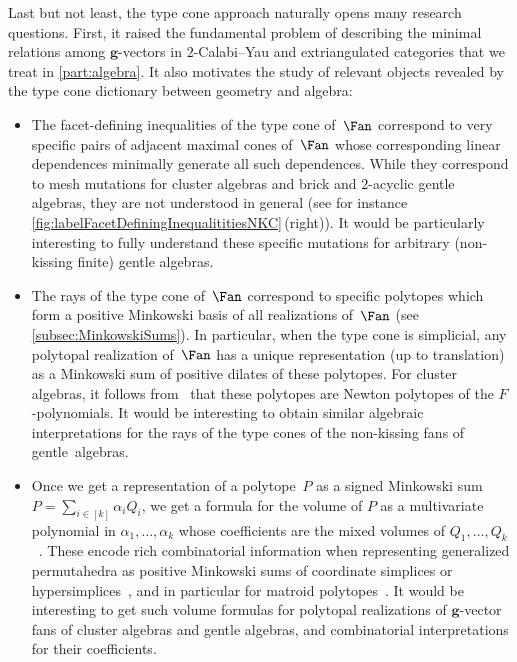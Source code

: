 \documentclass{amsart}
\theoremstyle{definition}
\renewcommand{\b}[1]{{\boldsymbol{#1}}} %
\begin{document}
\medskip
Last but not least, the type cone approach naturally opens many research questions.
First, it raised the fundamental problem of describing the minimal relations among $\b{g}$-vectors in $2$-Calabi--Yau and extriangulated categories that we treat in \cref{part:algebra}.
It also motivates the study of relevant objects revealed by the type cone dictionary between geometry and algebra:

\smallskip
\begin{itemize}
\item The facet-defining inequalities of the type cone of~$\Fan$ correspond to very specific pairs of adjacent maximal cones of~$\Fan$ whose corresponding linear dependences minimally generate all such dependences. While they correspond to mesh mutations for cluster algebras and brick and $2$-acyclic gentle algebras, they are not understood in general (see for instance \cref{fig:labelFacetDefiningInequalititiesNKC}\,(right)). It would be particularly interesting to fully understand these specific mutations for arbitrary (non-kissing finite) gentle algebras.

\smallskip
\item The rays of the type cone of~$\Fan$ correspond to specific polytopes which form a positive Minkowski basis of all realizations of~$\Fan$ (see \cref{subsec:MinkowskiSums}). In particular, when the type cone is simplicial, any polytopal realization of~$\Fan$ has a unique representation (up to translation) as a Minkowski sum of positive dilates of these polytopes. For cluster algebras, it follows from~\cite[Sect.~6]{BazierMatteChapelierLaguetDouvilleMousavandThomasYildirim} that these polytopes are Newton polytopes of the $F$-polynomials. It would be interesting to obtain similar algebraic interpretations for the rays of the type cones of the non-kissing fans of gentle~algebras.

\smallskip
\item Once we get a representation of a polytope~$P$ as a signed Minkowski sum~$P = \sum_{i \in [k]} \alpha_i Q_i$, we get a formula for the volume of $P$ as a multivariate polynomial in $\alpha_1, \dots, \alpha_k$ whose coefficients are the mixed volumes of $Q_1, \dots, Q_k$~\cite{ArdilaBenedettiDoker, McMullen-Valuations}. These encode rich combinatorial information when representing generalized permutahedra as positive Minkowski sums of coordinate simplices or hypersimplices~\cite{Postnikov}, and in particular for matroid polytopes~\cite{ArdilaBenedettiDoker}. It would be interesting to get such volume formulas for polytopal realizations of $\b{g}$-vector fans of cluster algebras and gentle algebras, and combinatorial interpretations for their coefficients.
\end{itemize}
\end{document}
